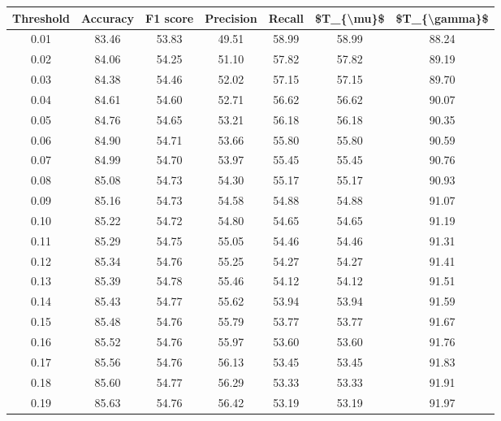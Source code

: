 \begin{tabular}{|c|c|c|c|c|c|c|}
\hline
 Threshold &  Accuracy &  F1 score &  Precision &  Recall &  \$T\_\{\textbackslash mu\}\$ &  \$T\_\{\textbackslash gamma\}\$ \\
\hline
      0.01 &     83.46 &     53.83 &      49.51 &   58.99 &      58.99 &         88.24 \\
      0.02 &     84.06 &     54.25 &      51.10 &   57.82 &      57.82 &         89.19 \\
      0.03 &     84.38 &     54.46 &      52.02 &   57.15 &      57.15 &         89.70 \\
      0.04 &     84.61 &     54.60 &      52.71 &   56.62 &      56.62 &         90.07 \\
      0.05 &     84.76 &     54.65 &      53.21 &   56.18 &      56.18 &         90.35 \\
      0.06 &     84.90 &     54.71 &      53.66 &   55.80 &      55.80 &         90.59 \\
      0.07 &     84.99 &     54.70 &      53.97 &   55.45 &      55.45 &         90.76 \\
      0.08 &     85.08 &     54.73 &      54.30 &   55.17 &      55.17 &         90.93 \\
      0.09 &     85.16 &     54.73 &      54.58 &   54.88 &      54.88 &         91.07 \\
      0.10 &     85.22 &     54.72 &      54.80 &   54.65 &      54.65 &         91.19 \\
      0.11 &     85.29 &     54.75 &      55.05 &   54.46 &      54.46 &         91.31 \\
      0.12 &     85.34 &     54.76 &      55.25 &   54.27 &      54.27 &         91.41 \\
      0.13 &     85.39 &     54.78 &      55.46 &   54.12 &      54.12 &         91.51 \\
      0.14 &     85.43 &     54.77 &      55.62 &   53.94 &      53.94 &         91.59 \\
      0.15 &     85.48 &     54.76 &      55.79 &   53.77 &      53.77 &         91.67 \\
      0.16 &     85.52 &     54.76 &      55.97 &   53.60 &      53.60 &         91.76 \\
      0.17 &     85.56 &     54.76 &      56.13 &   53.45 &      53.45 &         91.83 \\
      0.18 &     85.60 &     54.77 &      56.29 &   53.33 &      53.33 &         91.91 \\
      0.19 &     85.63 &     54.76 &      56.42 &   53.19 &      53.19 &         91.97 \\

\end{tabular}
